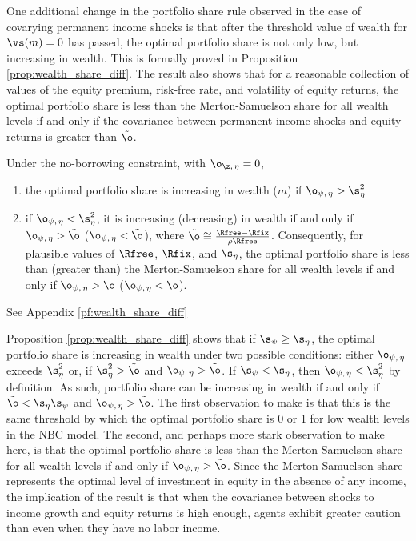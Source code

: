 One additional change in the portfolio share rule observed in the case of covarying permanent income shocks is that after the threshold value of wealth for $\vs(m) = 0$ has passed, the optimal portfolio share is not only low, but increasing in wealth. This is formally proved in Proposition \ref{prop:wealth_share_diff}. The result also shows that for a reasonable collection of values of the equity premium, risk-free rate, and volatility of equity returns, the optimal portfolio share is less than the Merton-Samuelson share for all wealth levels if and only if the covariance between permanent income shocks and equity returns is greater than $\tilde{\o}$.

\begin{prop}\label{prop:wealth_share_diff}
    Under the no-borrowing constraint, with $\o_{\z,\,\eta} = 0$, 
    \begin{enumerate}[topsep=0pt, itemsep=0pt, label=(\roman*)]
        \item the optimal portfolio share is increasing in wealth ($m$) if $\o_{\psi,\,\eta} > \s_{\eta}^2$
        \item if $\o_{\psi,\,\eta} < \s_{\eta}^2$, it is increasing (decreasing) in wealth if and only if $\o_{\psi,\,\eta} > \tilde{\o}$ ($\o_{\psi,\,\eta} < \tilde{\o}$), where $\tilde{\o} \cong \frac{\Rfree - \Rfix}{\rho\Rfree}$. Consequently, for plausible values of $\Rfree$, $\Rfix$, and $\s_{\eta}$, the optimal portfolio share is less than (greater than) the Merton-Samuelson share for all wealth levels if and only if $\o_{\psi,\,\eta} > \tilde{\o}$ ($\o_{\psi,\,\eta} < \tilde{\o}$).
    \end{enumerate}
\end{prop}

\pf See Appendix \ref{pf:wealth_share_diff}

Proposition \ref{prop:wealth_share_diff} shows that if $\s_{\psi} \geq \s_{\eta}$, the optimal portfolio share is increasing in wealth under two possible conditions: either $\o_{\psi,\,\eta}$ exceeds $\s_{\eta}^2$ or, if $\s_{\eta}^2 > \tilde{\o}$ and $\o_{\psi,\,\eta} > \tilde{\o}$. If $\s_{\psi} < \s_{\eta}$, then $\o_{\psi,\,\eta} < \s_{\eta}^2$ by definition. As such, portfolio share can be increasing in wealth if and only if $\tilde{\o} < \s_{\eta}\s_{\psi}$ and $\o_{\psi,\,\eta} > \tilde{\o}$. The first observation to make is that this is the same threshold by which the optimal portfolio share is 0 or 1 for low wealth levels in the NBC model. The second, and perhaps more stark observation to make here, is that the optimal portfolio share is less than the Merton-Samuelson share for all wealth levels if and only if $\o_{\psi,\,\eta} > \tilde{\o}$. Since the Merton-Samuelson share represents the optimal level of investment in equity in the absence of any income, the implication of the result is that when the covariance between shocks to income growth and equity returns is high enough, agents exhibit greater caution than even when they have no labor income.

